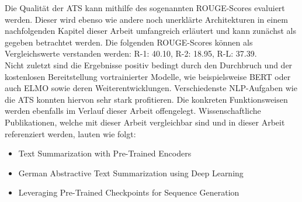 \noindent
Die Qualität der \ac{ATS} kann mithilfe des sogenannten ROUGE-Scores evaluiert werden. Dieser wird ebenso wie andere noch unerklärte Architekturen in einem nachfolgenden Kapitel dieser Arbeit umfangreich erläutert und kann zunächst als gegeben betrachtet werden. Die folgenden ROUGE-Scores können als Vergleichswerte verstanden werden: R-1: 40.10, R-2: 18.95, R-L: 37.39.\\

\noindent
Nicht zuletzt sind die Ergebnisse positiv bedingt durch den Durchbruch und der kostenlosen Bereitstellung vortrainierter Modelle, wie beispielsweise \ac{BERT} \cite{DEV19} oder auch \ac{ELMO} \cite{PET18} sowie deren Weiterentwicklungen. Verschiedenste \ac{NLP}-Aufgaben wie die \ac{ATS} konnten hiervon sehr stark profitieren. Die konkreten Funktionsweisen werden ebenfalls im Verlauf dieser Arbeit offengelegt. Wissenschaftliche Publikationen, welche mit dieser Arbeit vergleichbar sind und in dieser Arbeit referenziert werden, lauten wie folgt:

\begin{itemize}
	\item Text Summarization with Pre-Trained Encoders \cite{YAN19}
	\item German Abstractive Text Summarization using Deep Learning \cite{NIT19}
	\item Leveraging Pre-Trained Checkpoints for Sequence Generation \cite{ROT20}
\end{itemize}
